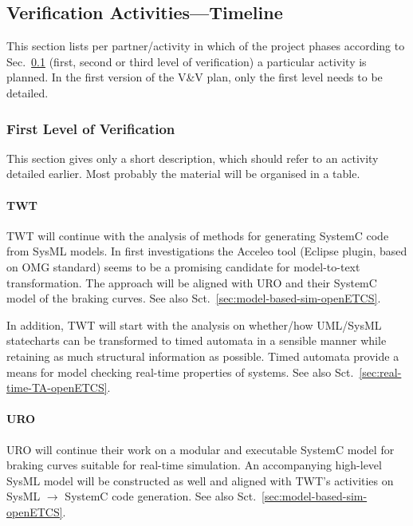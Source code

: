\documentclass{template/openetcs_report}
\begin{document}
\subsection{Verification Activities---Timeline}
\label{sec:verif-activ-timel}

This section lists per partner/activity in which of the project
phases according to Sec.~\ref{sec:verif-activ-timel} (first, second or
third level of verification) a particular activity is planned. In the
first version of the V\&V plan, only the first level needs to be detailed.


\subsubsection{First Level of Verification}
\label{sec:first-level-verif}

This section gives only a short description, which should refer to an activity
  detailed earlier. Most probably the material will be organised in a table.

  \paragraph{TWT}   
  TWT will continue with the analysis of methods for generating
  SystemC code from SysML models. In first investigations the Acceleo
  tool (Eclipse plugin, based on OMG standard) seems to be a promising
  candidate for model-to-text transformation. The approach will be
  aligned with URO and their SystemC model of the braking curves.  See
  also Sct.~\ref{sec:model-based-sim-openETCS}.

  In addition, TWT will start with the analysis on whether/how UML/SysML statecharts can be 
  transformed to timed automata in a sensible manner while retaining as
  much structural information as possible. Timed automata provide a means for model checking
  real-time properties of systems. See also Sct.~\ref{sec:real-time-TA-openETCS}.

  \paragraph{URO}
  URO will continue their work on a modular and executable SystemC
  model for braking curves suitable for real-time simulation. An
  accompanying high-level SysML model will be constructed as well and
  aligned with TWT's activities on SysML $\rightarrow$ SystemC code
  generation.  See also Sct.~\ref{sec:model-based-sim-openETCS}.
\end{document}
